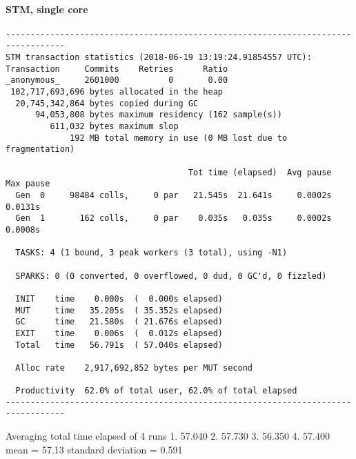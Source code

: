 \paragraph{STM, single core}
\begin{verbatim}
----------------------------------------------------------------------------------
STM transaction statistics (2018-06-19 13:19:24.91854557 UTC):
Transaction     Commits    Retries      Ratio
_anonymous_     2601000          0       0.00
 102,717,693,696 bytes allocated in the heap
  20,745,342,864 bytes copied during GC
      94,053,808 bytes maximum residency (162 sample(s))
         611,032 bytes maximum slop
             192 MB total memory in use (0 MB lost due to fragmentation)

                                     Tot time (elapsed)  Avg pause  Max pause
  Gen  0     98484 colls,     0 par   21.545s  21.641s     0.0002s    0.0131s
  Gen  1       162 colls,     0 par    0.035s   0.035s     0.0002s    0.0008s

  TASKS: 4 (1 bound, 3 peak workers (3 total), using -N1)

  SPARKS: 0 (0 converted, 0 overflowed, 0 dud, 0 GC'd, 0 fizzled)

  INIT    time    0.000s  (  0.000s elapsed)
  MUT     time   35.205s  ( 35.352s elapsed)
  GC      time   21.580s  ( 21.676s elapsed)
  EXIT    time    0.006s  (  0.012s elapsed)
  Total   time   56.791s  ( 57.040s elapsed)

  Alloc rate    2,917,692,852 bytes per MUT second

  Productivity  62.0% of total user, 62.0% of total elapsed
----------------------------------------------------------------------------------
\end{verbatim}
  
Averaging total time elapsed of 4 runs 
1. 57.040
2. 57.730
3. 56.350
4. 57.400
mean = 57.13
standard deviation = 0.591

